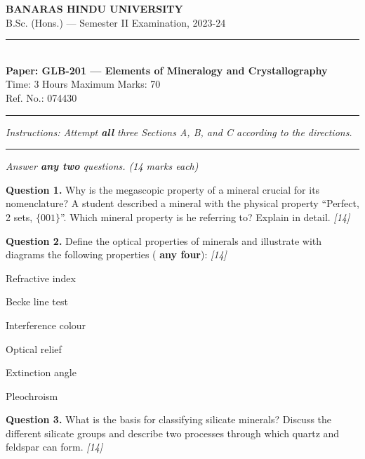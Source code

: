 \documentclass[11pt,a4paper]{article}
\newcommand{\pts}[1]{\hfill   \textit{[#1]}}
\begin{document}
\begin{center}
  {\large\bfseries BANARAS HINDU UNIVERSITY}\\[2pt]
  {\normalsize B.Sc. (Hons.) --- Semester II Examination, 2023-24}\\[6pt]
  \rule{0.8\linewidth}{0.5pt}\\[6pt]
  {\large\bfseries Paper: GLB-201 --- Elements of Mineralogy and Crystallography}\\[4pt]
  {\normalsize Time: 3 Hours \hfill Maximum Marks: 70}\\[2pt]
  {\small Ref. No.: 074430}
\end{center}
\rule{\linewidth}{0.4pt}
\smallskip



\noindent   \textit{Instructions: Attempt   \textbf{all} three Sections A, B, and C according to the directions.}
\bigskip

\bigskip


\rule{\linewidth}{0.4pt}\smallskip



\noindent   \textit{Answer   \textbf{any two} questions. (14 marks each)}
\medskip




\noindent   \textbf{Question 1.} Why is the megascopic property of a mineral crucial for its nomenclature? A student described a mineral with the physical property ``Perfect, 2 sets, $\{001\}$''. Which mineral property is he referring to? Explain in detail. \pts{14}

\medskip


\noindent   \textbf{Question 2.} Define the optical properties of minerals and illustrate with diagrams the following properties (   \textbf{any four}): \pts{14}

\begin{parts}
  \item Refractive index
  \item Becke line test
  \item Interference colour
  \item Optical relief
  \item Extinction angle
  \item Pleochroism
\end{parts}

\medskip


\noindent   \textbf{Question 3.} What is the basis for classifying silicate minerals? Discuss the different silicate groups and describe two processes through which quartz and feldspar can form. \pts{14}
\end{document}
